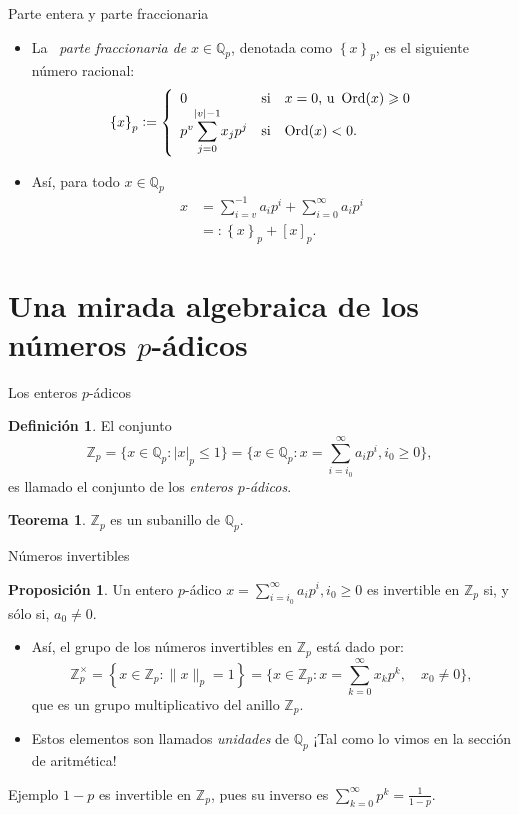 \documentclass{beamer}
\theoremstyle{definition}
\numberwithin{equation}{section}
\newcommand{\marine}[1]{\textcolor{defColor}{#1}}
\newcommand{\orangee}[1]{\textcolor{thColor}{#1}}
\newtheorem{df}{\marine{Definición}}
\newtheorem{thh}{\orangee{Teorema}}
\newtheorem{pr}{\orangee{Proposición}}
\newcommand{\tit}[1]{\textit{#1}}
\renewcommand{\geq}{\geqslant}
\renewcommand{\leq}{\leqslant}
\newcommand{\Qp}{\mathbb{Q}_p}
\newcommand{\Zp}{\mathbb{Z}_p}
\newcommand{\pnorm}[1]{\|#1\|_p}
\DeclareMathOperator{\ord}{Ord}
\begin{document}
\begin{frame}{Parte entera y parte fraccionaria}
	\begin{itemize}[<+- | alert@+>]
		
		\item La \textit{\ parte fraccionaria de }$x\in\Qp$, denotada como
		$\left\{  x\right\}  _{p}$, es el siguiente número racional:
		\[
		\left\{  x\right\}  _{p}:=\left\{
		\begin{array}
		[c]{llll}%
		0 & \text{si} & x=0\text{,}  \text{ u}\,  \, \ord (x)\geq0\\
		p^{v}
		{\displaystyle\sum\limits_{j=0}^{\left\vert v\right\vert -1}}
		
		x_{j}p^{j} & \text{si} & \ord (x)<0. &
		\end{array}
		\right.
		\]
		\item Así, para todo $x\in\mathbb{Q}_{p}$ 
		\begin{align*}
		x & =\sum_{i=v}^{-1}a_{i}p^{i}+\sum_{i=0}^{\infty}a_{i}p^{i}\\
		& =:\left\{ x\right\} _{p}+[x]_{p}.
		\end{align*}
	\end{itemize}

\end{frame}

\section{Una mirada algebraica de los números $p$-ádicos}

\begin{frame}{Los enteros $p$-ádicos}
	\begin{df}
		El conjunto
		\[
		\mathbb{Z}_{p} =\{x\in\Qp:|x|_{p}\leq1\}=\{x\in\Qp:x=\sum_{i=i_{0}}^{\infty} a_{i}p^{i},i_{0}\geq0\},
		\]
		es llamado el conjunto de los \textit{enteros $p$-ádicos}.
	\end{df}
\begin{thh}
	$\Zp$ es un subanillo de $\Qp$.
\end{thh}
\end{frame}

\begin{frame}{Números invertibles}
\begin{pr}
	Un entero $p$-ádico $x=\sum_{i=i_{0}}^{\infty}a_{i}p^{i},i_{0}\geq0$ es invertible en $\Zp$ si, y sólo si, $a_0\neq 0$.
\end{pr}
\begin{itemize}
	\item Así, el grupo de los números invertibles en $\Zp$ está dado por:
	$$
	\mathbb{Z}_{p}^{\times}=\left\{x \in \mathbb{Z}_{p}:\pnorm{x}=1\right\}=\Big\{x \in \mathbb{Z}_{p}: x=\sum_{k=0}^{\infty} x_{k} p^{k}, \quad x_{0} \neq 0\Big\},$$
	que es un grupo multiplicativo del anillo $\Zp$.
	\item Estos elementos son llamados \tit{unidades} de $\Qp$ ¡Tal como lo vimos en la sección de aritmética!
\end{itemize}
\begin{exampleblock}{Ejemplo}
	$1-p$ es invertible en $\Zp$, pues su inverso es $\sum_{k=0}^{\infty}p^k=\frac{1}{1-p}.$
\end{exampleblock}
\end{frame}
\end{document}
